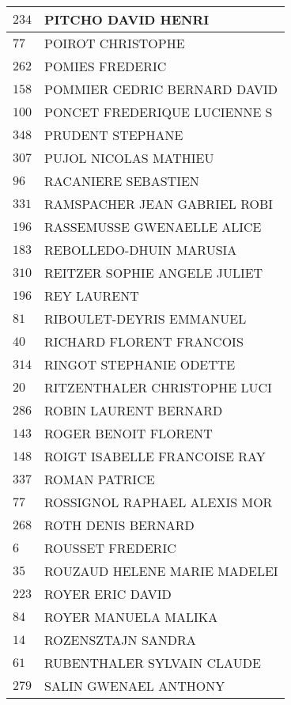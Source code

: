 \begin{xltabular}{\linewidth}{|l|X|}
    $234$ & PITCHO DAVID HENRI \\
    \hline
    $77$ & POIROT CHRISTOPHE \\
    \hline
    $262$ & POMIES FREDERIC \\
    \hline
    $158$ & POMMIER CEDRIC BERNARD DAVID \\
    \hline
    $100$ & PONCET FREDERIQUE LUCIENNE S \\
    \hline
    $348$ & PRUDENT STEPHANE \\
    \hline
    $307$ & PUJOL NICOLAS MATHIEU \\
    \hline
    $96$ & RACANIERE SEBASTIEN \\
    \hline
    $331$ & RAMSPACHER JEAN GABRIEL ROBI \\
    \hline
    $196$ & RASSEMUSSE GWENAELLE ALICE \\
    \hline
    $183$ & REBOLLEDO-DHUIN MARUSIA \\
    \hline
    $310$ & REITZER SOPHIE ANGELE JULIET \\
    \hline
    $196$ & REY LAURENT \\
    \hline
    $81$ & RIBOULET-DEYRIS EMMANUEL \\
    \hline
    $40$ & RICHARD FLORENT FRANCOIS \\
    \hline
    $314$ & RINGOT STEPHANIE ODETTE \\
    \hline
    $20$ & RITZENTHALER CHRISTOPHE LUCI \\
    \hline
    $286$ & ROBIN LAURENT BERNARD \\
    \hline
    $143$ & ROGER BENOIT FLORENT \\
    \hline
    $148$ & ROIGT ISABELLE FRANCOISE RAY \\
    \hline
    $337$ & ROMAN PATRICE \\
    \hline
    $77$ & ROSSIGNOL RAPHAEL ALEXIS MOR \\
    \hline
    $268$ & ROTH DENIS BERNARD \\
    \hline
    $6$ & ROUSSET FREDERIC \\
    \hline
    $35$ & ROUZAUD HELENE MARIE MADELEI \\
    \hline
    $223$ & ROYER ERIC DAVID \\
    \hline
    $84$ & ROYER MANUELA MALIKA \\
    \hline
    $14$ & ROZENSZTAJN SANDRA \\
    \hline
    $61$ & RUBENTHALER SYLVAIN CLAUDE \\
    \hline
    $279$ & SALIN GWENAEL ANTHONY \\

\end{xltabular}
